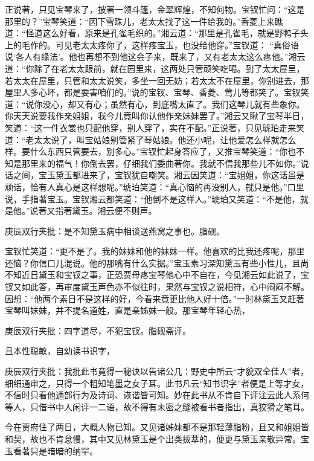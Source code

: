 \begin{parag}


    正说著，只见宝琴来了，披著一领斗篷，金翠辉煌，不知何物。宝钗忙问：“这是那里的？”宝琴笑道：“因下雪珠儿，老太太找了这一件给我的。”香菱上来瞧道：“怪道这么好看，原来是孔雀毛织的。”湘云道：“那里是孔雀毛，就是野鸭子头上的毛作的。可见老太太疼你了，这样疼宝玉，也没给他穿。”宝钗道： “真俗语说‘各人有缘法’。他也再想不到他这会子来，既来了，又有老太太这么疼他。”湘云道：“你除了在老太太跟前，就在园里来，这两处只管顽笑吃喝。到了太太屋里，若太太在屋里，只管和太太说笑，多坐一回无妨；若太太不在屋里，你别进去，那屋里人多心坏，都是要害咱们的。”说的宝钗、宝琴、香菱、莺儿等都笑了。宝钗笑道：“说你没心，却又有心；虽然有心，到底嘴太直了。我们这琴儿就有些象你。你天天说要我作亲姐姐，我今儿竟叫你认他作亲妹妹罢了。”湘云又瞅了宝琴半日，笑道：“这一件衣裳也只配他穿，别人穿了，实在不配。”正说著，只见琥珀走来笑道：“老太太说了，叫宝姑娘别管紧了琴姑娘。他还小呢，让他爱怎么样就怎么样。要什么东西只管要去，别多心。”宝钗忙起身答应了，又推宝琴笑道：“你也不知是那里来的福气！你倒去罢，仔细我们委曲著你。我就不信我那些儿不如你。”说话之间，宝玉黛玉都进来了，宝钗犹自嘲笑。湘云因笑道：“宝姐姐，你这话虽是顽话，恰有人真心是这样想呢。”琥珀笑道：“真心恼的再没别人，就只是他。”口里说，手指著宝玉。宝钗湘云都笑道：“他倒不是这样人。”琥珀又笑道：“不是他，就是他。”说著又指著黛玉。湘云便不则声。\begin{note}庚辰双行夹批：是不知黛玉病中相谈送燕窝之事也。脂砚。\end{note}宝钗忙笑道：“更不是了。我的妹妹和他的妹妹一样。他喜欢的比我还疼呢，那里还恼？你信口儿混说。他的那嘴有什么实据。”宝玉素习深知黛玉有些小性儿，且尚不知近日黛玉和宝钗之事，正恐贾母疼宝琴他心中不自在，今见湘云如此说了，宝钗又如此答，再审度黛玉声色亦不似往时，果然与宝钗之说相符，心中闷闷不解。因想：“他两个素日不是这样的好，今看来竟更比他人好十倍。”一时林黛玉又赶著宝琴叫妹妹，并不提名道姓，直是亲姊妹一般。那宝琴年轻心热，\begin{note}庚辰双行夹批：四字道尽，不犯宝钗。脂砚斋评。\end{note}且本性聪敏，自幼读书识字，\begin{note}庚辰双行夹批：我批此书竟得一秘诀以告诸公几：野史中所云“才貌双全佳人”者，细细通审之，只得一个粗知笔墨之女子耳。此书凡云“知书识字”者便是上等才女，不信时只看他通部行为及诗词、诙谐皆可知。妙在此书从不肯自下评注云此人系何等人，只借书中人闲评一二语，故不得有未密之缝被看书者指出，真狡猾之笔耳。\end{note}今在贾府住了两日，大概人物已知。又见诸姊妹都不是那轻薄脂粉，且又和姐姐皆和契，故也不肯怠慢，其中又见林黛玉是个出类拔萃的，便更与黛玉亲敬异常。宝玉看著只是暗暗的纳罕。
\end{parag}


